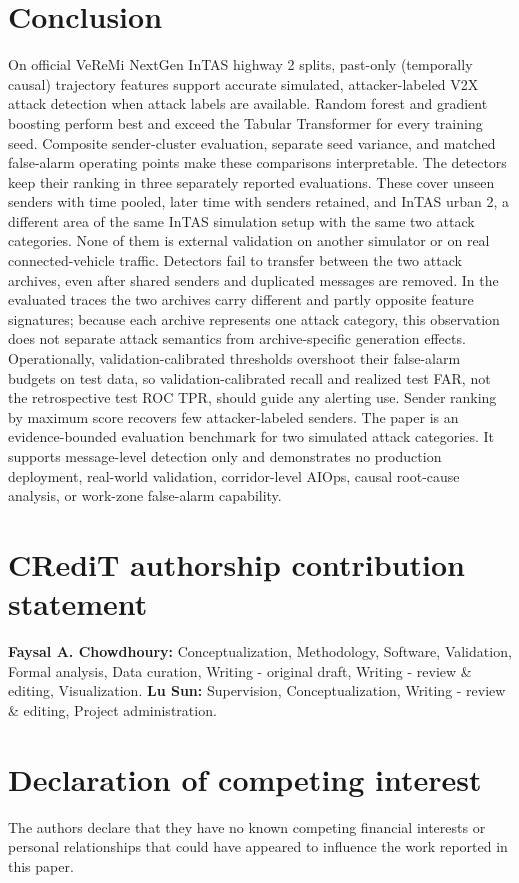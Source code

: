 \documentclass[preprint,12pt,numafflabel]{elsarticle}
\begin{document}
\section{Conclusion}
On official VeReMi NextGen InTAS highway 2 splits, past-only (temporally causal) trajectory features support accurate simulated, attacker-labeled V2X attack detection when attack labels are available. Random forest and gradient boosting perform best and exceed the Tabular Transformer for every training seed. Composite sender-cluster evaluation, separate seed variance, and matched false-alarm operating points make these comparisons interpretable. The detectors keep their ranking in three separately reported evaluations. These cover unseen senders with time pooled, later time with senders retained, and InTAS urban 2, a different area of the same InTAS simulation setup with the same two attack categories. None of them is external validation on another simulator or on real connected-vehicle traffic. Detectors fail to transfer between the two attack archives, even after shared senders and duplicated messages are removed. In the evaluated traces the two archives carry different and partly opposite feature signatures; because each archive represents one attack category, this observation does not separate attack semantics from archive-specific generation effects. Operationally, validation-calibrated thresholds overshoot their false-alarm budgets on test data, so validation-calibrated recall and realized test FAR, not the retrospective test ROC TPR, should guide any alerting use. Sender ranking by maximum score recovers few attacker-labeled senders. The paper is an evidence-bounded evaluation benchmark for two simulated attack categories. It supports message-level detection only and demonstrates no production deployment, real-world validation, corridor-level AIOps, causal root-cause analysis, or work-zone false-alarm capability.

\section*{CRediT authorship contribution statement}
\textbf{Faysal A. Chowdhoury:} Conceptualization, Methodology, Software, Validation, Formal analysis, Data curation, Writing - original draft, Writing - review \& editing, Visualization. \textbf{Lu Sun:} Supervision, Conceptualization, Writing - review \& editing, Project administration.

\section*{Declaration of competing interest}
The authors declare that they have no known competing financial interests or personal relationships that could have appeared to influence the work reported in this paper.
\end{document}
